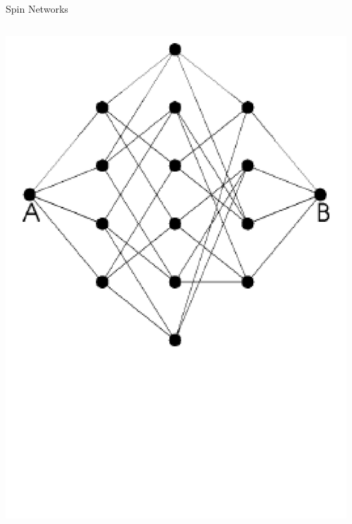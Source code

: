 \documentclass{beamer}
\begin{document}
\begin{frame}[t]{Spin Networks}
\begin{columns}[T]
\begin{column}{0.33\textwidth}
    		\includegraphics[trim=0 0 0 70mm, width=\textwidth]{Images/chain3_cubic_flattened}
		\end{column}
     	\begin{column}{0.33\textwidth}
     		\centering

\end{column}
\end{columns}
\end{frame}
\end{document}
